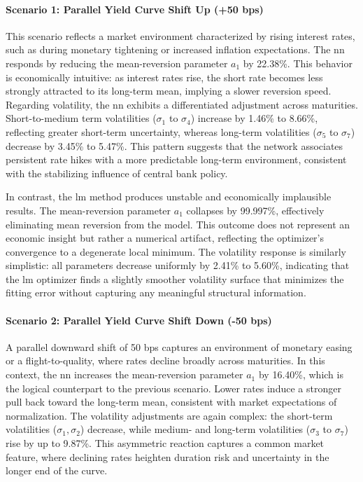 \paragraph{Scenario 1: Parallel Yield Curve Shift Up (+50 \ac{bps})}
This scenario reflects a market environment characterized by rising interest rates, such as during monetary tightening or increased inflation expectations. The \ac{nn} responds by reducing the mean-reversion parameter \( a_1 \) by 22.38\%. This behavior is economically intuitive: as interest rates rise, the short rate becomes less strongly attracted to its long-term mean, implying a slower reversion speed. Regarding volatility, the \ac{nn} exhibits a differentiated adjustment across maturities. Short-to-medium term volatilities (\( \sigma_1 \) to \( \sigma_4 \)) increase by 1.46\% to 8.66\%, reflecting greater short-term uncertainty, whereas long-term volatilities (\( \sigma_5 \) to \( \sigma_7 \)) decrease by 3.45\% to 5.47\%. This pattern suggests that the network associates persistent rate hikes with a more predictable long-term environment, consistent with the stabilizing influence of central bank policy.

In contrast, the \ac{lm} method produces unstable and economically implausible results. The mean-reversion parameter \( a_1 \) collapses by 99.997\%, effectively eliminating mean reversion from the model. This outcome does not represent an economic insight but rather a numerical artifact, reflecting the optimizer's convergence to a degenerate local minimum. The volatility response is similarly simplistic: all parameters decrease uniformly by 2.41\% to 5.60\%, indicating that the \ac{lm} optimizer finds a slightly smoother volatility surface that minimizes the fitting error without capturing any meaningful structural information.

\paragraph{Scenario 2: Parallel Yield Curve Shift Down (-50 \ac{bps})}
A parallel downward shift of 50 \ac{bps} captures an environment of monetary easing or a flight-to-quality, where rates decline broadly across maturities. In this context, the \ac{nn} increases the mean-reversion parameter \( a_1 \) by 16.40\%, which is the logical counterpart to the previous scenario. Lower rates induce a stronger pull back toward the long-term mean, consistent with market expectations of normalization. The volatility adjustments are again complex: the short-term volatilities (\( \sigma_1, \sigma_2 \)) decrease, while medium- and long-term volatilities (\( \sigma_3 \) to \( \sigma_7 \)) rise by up to 9.87\%. This asymmetric reaction captures a common market feature, where declining rates heighten duration risk and uncertainty in the longer end of the curve.

